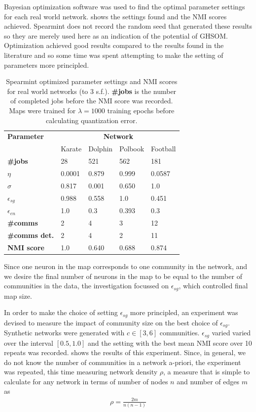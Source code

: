\documentclass{report}
\begin{document}
	
	Bayesian optimization \cite{snoek2013bayesian} software was used to find the optimal parameter settings for each real world network.  shows the settings found and the NMI scores achieved. 
	Spearmint does not record the random seed that generated these results so they are merely used here as an indication of the potential of GHSOM. 
	Optimization achieved good results compared to the results found in the literature and so some time was spent attempting to make the setting of parameters more principled.
	
	\begin{table}
		\centering
		\begin{tabular}{p{1.95cm} l l l l}
			\toprule
			\textbf{Parameter} & \multicolumn{4}{c}{\textbf{Network}} \\
			{} & Karate & Dolphin & Polbook & Football \\
			\bottomrule
			\textbf{\#jobs} & 28 & 521 & 562 & 181 \\
			\bottomrule
			$\eta$ & 0.0001 & 0.879 & 0.999 & 0.0587 \\
			$\sigma$ & 0.817 & 0.001 & 0.650 & 1.0 \\
			$\epsilon_{sg}$ & 0.988 & 0.558 & 1.0 &  0.451 \\
			$\epsilon_{en}$ & 1.0 & 0.3 & 0.393 & 0.3 \\
			\bottomrule
			\textbf{\#comms} & 2 & 4 & 3 & 12 \\
			\textbf{\#comms det.} & 2 & 4 & 2 & 11 \\
			\textbf{NMI score} & 1.0 & 0.640 & 0.688 & 0.874 \\
			\bottomrule
		\end{tabular}
		\caption{Spearmint optimized parameter settings and NMI scores for real world networks (to 3 s.f.). \textbf{\#jobs} is the number of completed jobs before the NMI score was recorded. Maps were trained for $\lambda=1000$ training epochs before calculating quantization error.}
		\label{spearmint}
	\end{table}
	
 
	Since one neuron in the map corresponds to one community in the network, and we desire the final number of neurons in the map to be equal to the number of communities in the data, the investigation focussed on $\epsilon_{sg}$, which controlled final map size. 
	
	In order to make the choice of setting $\epsilon_{sg}$ more principled, an experiment was devised to measure the impact of community size on the best choice of $\epsilon_{sg}$. Synthetic networks were generated with $c\in[3,6]$ communities. $\epsilon_{sg}$ varied varied over the interval $[0.5, 1.0]$ and the setting with the best mean NMI score over 10 repeats was recorded.  shows the results of this experiment. Since, in general, we do not know the number of communities in a network a-priori, the experiment was repeated, this time measuring network density $\rho$, a measure that is simple to calculate for any network in terms of number of nodes $n$ and number of edges $m$ as 
	\begin{align*}
	\rho = \frac{2 m}{n (n - 1)}
	\end{align*}
	
\end{document}
